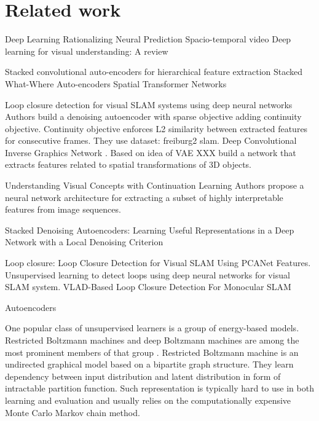 
\chapter{Related work}
Deep Learning \cite{LeCun2015}
Rationalizing Neural Prediction \cite{Lei2016}
Spacio-temporal video \cite{Patraucean2016}
Deep learning for visual understanding: A review \cite{Guo2016}

Stacked convolutional auto-encoders for hierarchical feature extraction \cite{Masci2011}
Stacked What-Where Auto-encoders \cite{Zhao2015}
Spatial Transformer Networks \cite{Jaderberg2015}

Loop closure detection for visual SLAM systems using deep neural networks \cite{Gao2015}
Authors build a denoising autoencoder with sparse objective adding continuity objective.
Continuity objective enforces L2 similarity between extracted features for consecutive frames. They use dataset: freiburg2 slam.
Deep Convolutional Inverse Graphics Network \cite{Kulkarni2015}.
Based on idea of VAE XXX build a network that extracts features related to spatial transformations of 3D objects.

Understanding Visual Concepts with Continuation Learning \cite{Whitney2016}
Authors propose a neural network architecture for extracting a subset of highly interpretable features
from image sequences.

Stacked Denoising Autoencoders: Learning Useful Representations in a Deep Network with a Local Denoising Criterion \cite{Vincent2010}

Loop closure:
Loop Closure Detection for Visual SLAM Using PCANet Features.
Unsupervised learning to detect loops using deep neural networks for visual SLAM system.
VLAD-Based Loop Closure Detection For Monocular SLAM \cite{Xia2016, Gao2015a, Huang2016}


Autoencoders


One popular class of unsupervised learners is a group of energy-based models.
Restricted Boltzmann machines and deep Boltzmann machines are among the most prominent members of that group \cite{Ackley1985, Salakhutdinov2009}.
Restricted Boltzmann machine is an undirected graphical model based on a bipartite graph structure.
They learn dependency between input distribution and latent distribution in form of intractable partition function.
Such representation is typically hard to use in both learning and evaluation and usually relies on the computationally expensive Monte Carlo Markov chain method.


